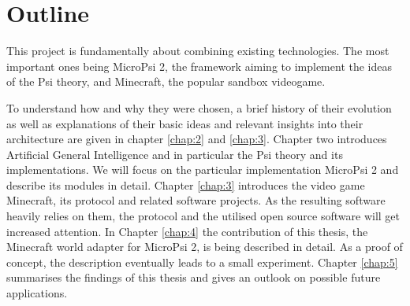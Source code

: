 
\section{Outline}
This project is fundamentally about combining existing technologies. The most important ones being MicroPsi 2, the framework aiming to implement the ideas of the Psi theory, and Minecraft, the popular sandbox videogame.

To understand how and why they were chosen, a brief history of their evolution as well as explanations of their basic ideas and relevant insights into their architecture are given in chapter \ref{chap:2} and \ref{chap:3}. Chapter two introduces Artificial General Intelligence and in particular the Psi theory and its implementations. We will focus on the particular implementation MicroPsi 2 and describe its modules in detail. Chapter \ref{chap:3} introduces the video game Minecraft, its protocol and related software projects. As the resulting software heavily relies on them, the protocol and the utilised open source software will get increased attention. 
In Chapter \ref{chap:4} the contribution of this thesis, the Minecraft world adapter for MicroPsi 2, is being described in detail. As a proof of concept, the description eventually leads to a small experiment.
Chapter \ref{chap:5} summarises the findings of this thesis and gives an outlook on possible future applications.